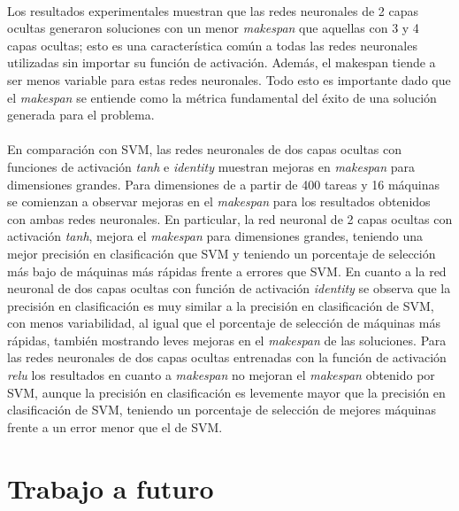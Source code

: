 \paragraph{}Los resultados experimentales muestran que las redes neuronales de 2 capas ocultas generaron soluciones con un menor \textit{makespan} que aquellas con 3 y 4 capas ocultas; esto es una característica común a todas las redes neuronales utilizadas sin importar su función de activación.
Además, el makespan tiende a ser menos variable para estas redes neuronales.
Todo esto es importante dado que el \textit{makespan} se entiende como la métrica fundamental del éxito de una solución generada para el problema.

\paragraph{}En comparación con SVM, las redes neuronales de dos capas ocultas con funciones de activación \textit{tanh} e \textit{identity} muestran mejoras en \textit{makespan} para dimensiones grandes.
Para dimensiones de a partir de 400 tareas y 16 máquinas se comienzan a observar mejoras en el \textit{makespan} para los resultados obtenidos con ambas redes neuronales.
En particular, la red neuronal de 2 capas ocultas con activación \textit{tanh}, mejora el \textit{makespan} para dimensiones grandes, teniendo una mejor precisión en clasificación que SVM y teniendo un porcentaje de selección más bajo de máquinas más rápidas frente a errores que SVM.
En cuanto a la red neuronal de dos capas ocultas con función de activación \textit{identity} se observa que la precisión en clasificación es muy similar a la precisión en clasificación de SVM, con menos variabilidad, al igual que el porcentaje de selección de máquinas más rápidas, también mostrando leves mejoras en el \textit{makespan} de las soluciones.
Para las redes neuronales de dos capas ocultas entrenadas con la función de activación \textit{relu} los resultados en cuanto a \textit{makespan} no mejoran el \textit{makespan} obtenido por SVM, aunque la precisión en clasificación es levemente mayor que la precisión en clasificación de SVM, teniendo un porcentaje de selección de mejores máquinas frente a un error menor que el de SVM. 

\section{Trabajo a futuro}

